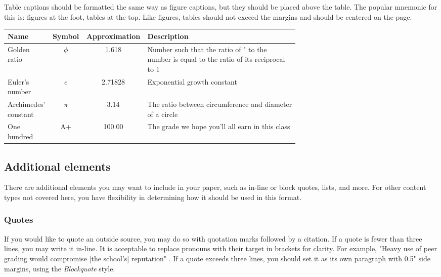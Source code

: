 \documentclass[
	letterpaper, %
]{jdf}
\begin{document}
Table captions should be formatted the same way as figure captions, but they should be placed above the table. The popular mnemonic for this is: figures at the foot, tables at the top. Like figures, tables should not exceed the margins and should be centered on the page.

\begin{jdftable}
\label{table:Example}
\small %
\begin{tabular}{@{} L{0.15\linewidth} c S L{0.52\linewidth}}
	\textbf{Name} & \textbf{Symbol} & \textbf{Approximation} & \textbf{Description} \\
	\toprule[0.5pt]
	Golden ratio & $\phi$ & 1.618 & Number such that the ratio of " to the number is equal to the ratio of its reciprocal to 1\\
	\midrule
	Euler's number & $e$ & 2.71828 & Exponential growth constant\\
	\midrule
	Archimedes' constant & $\pi$ & 3.14 & The ratio between circumference and diameter of a circle\\
	\midrule
	One hundred & A+ & 100.00 & The grade we hope you’ll all earn in this class\\
\end{tabular}
\end{jdftable}

\subsection{Additional elements}
There are additional elements you may want to include in your paper, such as in-line or block quotes, lists, and more. For other content types not covered here, you have flexibility in determining how it should be used in this format.

\subsubsection{Quotes}
If you would like to quote an outside source, you may do so with quotation marks followed by a citation. If a quote is fewer than three lines, you may write it in-line. It is acceptable to replace pronouns with their target in brackets for clarity. For example, "Heavy use of peer grading would compromise [the school’s] reputation" \citep{joyner2016}. If a quote exceeds three lines, you should set it as its own paragraph with 0.5" side margins, using the \emph{Blockquote} style.
\end{document}
